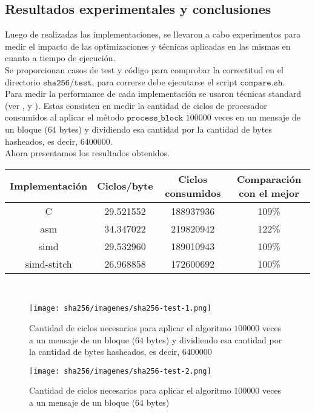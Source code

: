 \subsection{Resultados experimentales y conclusiones}
Luego de realizadas las implementaciones, se llevaron a cabo experimentos para medir el impacto de las optimizaciones y técnicas aplicadas en las mismas en cuanto a tiempo de ejecución.\\
\indent Se proporcionan casos de test y código para comprobar la correctitud en el directorio $\texttt{sha256/test}$, para correrse debe ejecutarse el script $\texttt{compare.sh}$. \\
\indent Para medir la performance de cada implementación se usaron técnicas standard (ver \cite{shaintelimp}, \cite{TiempoSha1} y \cite{TiempoSha2}). Estas consisten en medir la cantidad de ciclos de procesador consumidos al aplicar el método $\texttt{process\_block}$ $100000$ veces en un mensaje de un bloque ($64$ bytes) y dividiendo esa cantidad por la cantidad de bytes hasheados, es decir, $6400000$. \\
\indent Ahora presentamos los resultados obtenidos.

\begin{center}
\begin{tabular}{|c | c | c | c |}
\hline
Implementación & Ciclos/byte & Ciclos consumidos & Comparación con el mejor\\
\hline
C & 29.521552 & 188937936 & 109\% \\
\hline
asm & 34.347022 & 219820942 & 122\% \\
\hline
simd & 29.532960 & 189010943 & 109\% \\
\hline 
simd-stitch & 26.968858 & 172600692 & 100\% \\
\hline 
\end{tabular} \\
\end{center}
\begin{center}
\begin{figure}[H]
    \texttt{[image: sha256/imagenes/sha256-test-1.png]}
    \caption{Cantidad de ciclos necesarios para aplicar el algoritmo $100000$ veces a un mensaje de un bloque ($64$ bytes) y dividiendo esa cantidad por la cantidad de bytes hasheados, es decir, $6400000$}
\end{figure}
\end{center}

\begin{center}
\begin{figure}[H]
    \texttt{[image: sha256/imagenes/sha256-test-2.png]}
    \caption{Cantidad de ciclos necesarios para aplicar el algoritmo $100000$ veces a un mensaje de un bloque ($64$ bytes)}
\end{figure}
\end{center}

